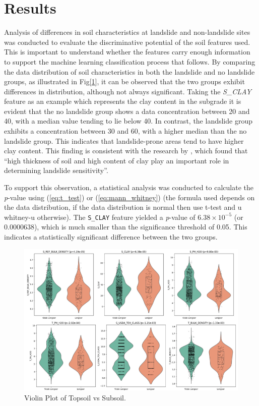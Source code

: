 \section{Results}
Analysis of differences in soil characteristics at landslide and non-landslide sites was conducted to evaluate the discriminative potential of the soil features used. This is important to understand whether the features carry enough information to support the machine learning classification process that follows. By comparing the data distribution of soil characteristics in both the landslide and no landslide groups, as illustrated in Fig[\ref{fig:Violin-plot}], it can be observed that the two groups exhibit differences in distribution, although not always significant. Taking the \textit{S\_CLAY} feature as an example which represents the clay content in the subgrade it is evident that the no landslide group shows a data concentration between 20 and 40, with a median value tending to lie below 40. In contrast, the landslide group exhibits a concentration between 30 and 60, with a higher median than the no landslide group. This indicates that landslide-prone areas tend to have higher clay content. This finding is consistent with the research by \cite{reslt01}, which found that “high thickness of soil and high content of clay play an important role in determining landslide sensitivity”.

To support this observation, a statistical analysis was conducted to calculate the \textit{p}-value using (\ref{eq:t_test}) or (\ref{eq:mann_whitney}) (the formula used depends on the data distribution, if the data distribution is normal then use t-test and u whitney-u otherwise). The \texttt{S\_CLAY} feature yielded a \textit{p}-value of $6.38 \times 10^{-5}$ (or 0.0000638), which is much smaller than the significance threshold of 0.05. This indicates a statistically significant difference between the two groups.

\begin{figure}[htbp]
    \centerline{\includegraphics[width=\linewidth]{fig6.png}}
    \caption{Violin Plot of Topsoil vs Subsoil.}
    \label{fig:Violin-plot}
\end{figure}


